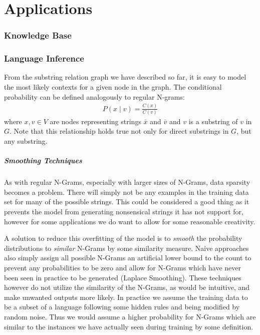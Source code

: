 \chapter{Applications}

\subsection{Knowledge Base}

\subsection{Language Inference}

From the substring relation graph we have described so far, it is easy to model the most likely contexts for a given node in the graph. The conditional probability can be defined analogously to regular N-grams:
\begin{align*}
    P(x \mid v) = \frac{C(x)}{C(v)}
\end{align*}
where $x, v \in V$ are nodes representing strings $\bar{x}$ and $\bar{v}$ and $v$ is a substring of $v$ in $G$. Note that this relationship holds true not only for direct substrings in $G$, but any substring.

\paragraph{Smoothing Techniques}
As with regular N-Grams, especially with larger sizes of N-Grams, data sparsity becomes a problem. There will simply not be any examples in the training data set for many of the possible strings. This could be considered a good thing as it prevents the model from generating nonsensical strings it has not support for, however for some applications we do want to allow for some reasonable creativity.

A solution to reduce this overfitting of the model is to \textit{smooth} the probability distributions to \textit{similar} N-Grams by some similarity measure. Naive approaches also simply assign all possible N-Grams an artificial lower bound to the count to prevent any probabilities to be zero and allow for N-Grams which have never been seen in practice to be generated (Laplace Smoothing). These techniques however do not utilize the similarity of the N-Grams, as would be intuitive, and make unwanted outputs more likely.
In practice we assume the training data to be a subset of a language following some hidden rules and being modified by random noise. Thus we would assume a higher probability for N-Grams which are similar to the instances we have actually seen during training by some definition.

